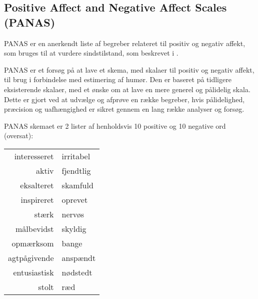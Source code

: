 \subsection{Positive Affect and Negative Affect Scales (PANAS)}
PANAS er en anerkendt liste af begreber relateret til positiv og negativ affekt, som bruges til at vurdere sindstilstand, som beskrevet i \citet{panas}.


PANAS er et forsøg på at lave et skema, med skalaer til positiv og negativ affekt, til brug i forbindelse med estimering af humør.
Den er baseret på tidligere eksisterende skalaer, med et ønske om at lave en mere generel og pålidelig skala.
Dette er gjort ved at udvælge og afprøve en række begreber, hvis pålidelighed, præcision og uafhængighed er sikret gennem en lang række analyser og forsøg.

PANAS skemaet er 2 lister af henholdsvis 10 positive og 10 negative ord (oversat):\\
\begin{center}
\begin{tabular}{r | l}
interesseret & irritabel \\\newline
aktiv & fjendtlig \\\newline
eksalteret & skamfuld \\\newline
inspireret & oprevet \\\newline
stærk & nervøs \\\newline
målbevidst & skyldig \\\newline
opmærksom & bange \\\newline
agtpågivende & anspændt \\\newline
entusiastisk & nødstedt \\\newline
stolt & ræd
\end{tabular}
\end{center}

